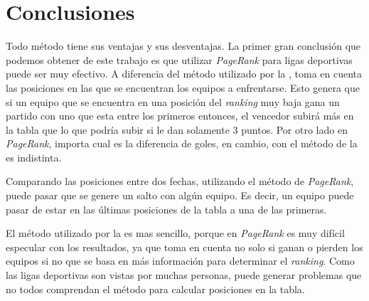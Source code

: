 \section{Conclusiones}

	Todo método tiene sus ventajas y sus desventajas. La primer gran conclusión que podemos obtener de este trabajo es que utilizar \emph{PageRank} para ligas deportivas puede ser muy efectivo. A diferencia del método utilizado por la , toma en cuenta las posiciones en las que se encuentran los equipos a enfrentarse. Esto genera que si un equipo que se encuentra en una posición del \emph{ranking} muy baja gana un partido con uno que esta entre los primeros entonces, el vencedor subirá más en la tabla que lo que podría subir si le dan solamente 3 puntos. Por otro lado en \emph{PageRank}, importa cual es la diferencia de goles, en cambio, con el método de la  es indistinta.

	Comparando las posiciones entre dos fechas, utilizando el método de \emph{PageRank}, puede pasar que se genere un salto con algún equipo. Es decir, un equipo puede pasar de estar en las últimas posiciones de la tabla a una de las primeras.

	El método utilizado por la  es mas sencillo, porque en \emph{PageRank} es muy difícil especular con los resultados, ya que toma en cuenta no solo si ganan o pierden los equipos si no que se basa en más información para determinar el \emph{ranking}. Como las ligas deportivas son vistas por muchas personas, puede generar problemas que no todos comprendan el método para calcular posiciones en la tabla. 
